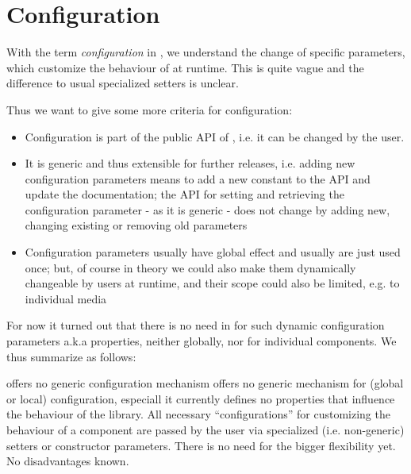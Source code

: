 \section{Configuration}%
\label{sec:Konfiguration}%

With the term \emph{configuration} in \LibName{}, we understand the change of specific parameters, which customize the behaviour of \LibName{} at runtime. This is quite vague and the difference to usual specialized setters is unclear.

Thus we want to give some more criteria for configuration:
\begin{itemize}
\item Configuration is part of the public API of \LibName{}, i.e. it can be changed by the user.
\item It is generic and thus extensible for further releases, i.e. adding new configuration parameters means to add a new constant to the API and update the documentation; the API for setting and retrieving the configuration parameter - as it is generic - does not change by adding new, changing existing or removing old parameters
\item Configuration parameters usually have global effect and usually are just used once; but, of course in theory we could also make them dynamically changeable by users at runtime, and their scope could also be limited, e.g. to individual media
\end{itemize}

For now it turned out that there is no need in \LibName{} for such dynamic configuration parameters a.k.a properties, neither globally, nor for individual components. We thus summarize as follows:

{%
\LibName{} offers no generic configuration mechanism
}
{%
\LibName{} offers no generic mechanism for (global or local) configuration, especiall it currently defines no properties that influence the behaviour of the library. All necessary ``configurations'' for customizing the behaviour of a component are passed by the user via specialized (i.e. non-generic) setters or constructor  parameters.
}
{%
There is no need for the bigger flexibility yet.
}
{%
No disadvantages known.
}


